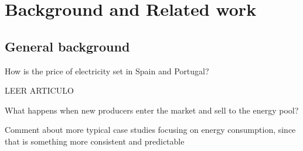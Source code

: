 \documentclass[12pt]{report} %
\begin{document}
\chapter{Background and Related work}



\section{General background}
How is the price of electricity set in Spain and Portugal?

LEER ARTICULO \cite{precio_electricidad_edem}


What happens when new producers enter the market and sell to the energy pool?

Comment about more typical case studies focusing on energy consumption, since that is something more consistent and predictable
\end{document}
